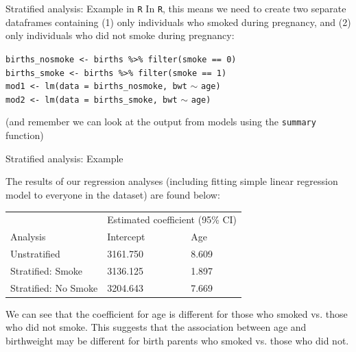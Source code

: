 \documentclass[10pt,t]{beamer}
\begin{document}
\begin{frame}{Stratified analysis: Example in \texttt{R}}
In \texttt{R}, this means we need to create two separate dataframes containing (1) only individuals who smoked during pregnancy, and (2) only individuals who did not smoke during pregnancy:

\vspace{0.3cm}

\texttt{births\_nosmoke <- births \%>\% filter(smoke == 0)} \\
\texttt{births\_smoke <- births \%>\% filter(smoke == 1)} \\
\texttt{mod1 <- lm(data = births\_nosmoke, bwt} $\sim$ \texttt{age)} \\
\texttt{mod2 <- lm(data = births\_smoke, bwt} $\sim$ \texttt{age)}

\vspace{0.3cm}

(and remember we can look at the output from models using the \texttt{summary} function)

\end{frame}

\begin{frame}{Stratified analysis: Example}

The results of our regression analyses (including fitting simple linear regression model to everyone in the dataset) are found below:

\vspace{0.3cm}

\begin{table}
	\centering
	\begin{tabular}{lll}
		& \multicolumn{2}{l}{Estimated coefficient (95\% CI)} \\
		\multicolumn{1}{l|}{Analysis}             & \multicolumn{1}{l|}{Intercept}        & Age         \\ \hline
		\multicolumn{1}{l|}{Unstratified}           & \multicolumn{1}{l|}{3161.750}         & 8.609       \\ \hline
		\multicolumn{1}{l|}{Stratified: Smoke}    & \multicolumn{1}{l|}{3136.125}         & 1.897       \\ \hline
		\multicolumn{1}{l|}{Stratified: No Smoke} & \multicolumn{1}{l|}{3204.643}         & 7.669      
	\end{tabular}
\end{table}

\vspace{0.3cm}

We can see that the coefficient for age is different for those who smoked vs. those who did not smoke. This suggests that the association between age and birthweight may be different for birth parents who smoked vs. those who did not. 

\end{frame}
\end{document}
